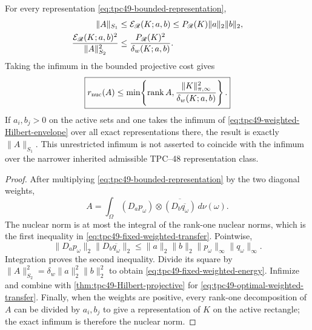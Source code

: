 \begin{theorem}
\label{thm:tpc49-weighted-transfer}
For every representation \eqref{eq:tpc49-bounded-representation},
\begin{align}
 \|A\|_{S_1}
 &\le \mathcal E_{\mathscr R}(K;a,b)
 \le P_{\mathscr R}(K)\|a\|_2\|b\|_2,
 \label{eq:tpc49-fixed-weighted-transfer}\\
 \frac{\mathcal E_{\mathscr R}(K;a,b)^2}{\|A\|_{S_2}^2}
 &\le\frac{P_{\mathscr R}(K)^2}{\delta_w(K;a,b)}.
 \label{eq:tpc49-fixed-weighted-energy}
\end{align}
Taking the infimum in the bounded projective cost gives
\begin{equation}
 \boxed{
 r_{\rm nuc}(A)
 \le\min\!\left\{\operatorname{rank}A,
 \frac{\|K\|_{\pi,\infty}^2}{\delta_w(K;a,b)}
 \right\}.}
 \label{eq:tpc49-optimal-weighted-transfer}
\end{equation}
If \(a_i,b_j>0\) on the active sets and one takes the infimum of
\eqref{eq:tpc49-weighted-Hilbert-envelope} over all exact
representations there, the result is exactly \(\|A\|_{S_1}\).
This unrestricted infimum is not asserted to coincide with the infimum
over the narrower inherited admissible TPC--48 representation class.
\end{theorem}

\begin{proof}
After multiplying \eqref{eq:tpc49-bounded-representation} by the two
diagonal weights,
\begin{equation}
 A=\int_\Omega
 (D_ap_\omega)\otimes
 \overline{(D_b\overline{q_\omega})}\,d\nu(\omega).
 \label{eq:tpc49-weighted-rank-one-integral}
\end{equation}
The nuclear norm is at most the integral of the rank-one nuclear norms,
which is the first inequality in
\eqref{eq:tpc49-fixed-weighted-transfer}.  Pointwise,
\begin{equation}
 \|D_ap_\omega\|_2
 \|D_b\overline{q_\omega}\|_2
 \le\|a\|_2\|b\|_2
 \|p_\omega\|_\infty\|q_\omega\|_\infty.
 \label{eq:tpc49-layer-sup-to-Hilbert}
\end{equation}
Integration proves the second inequality.  Divide its square by
 \(\|A\|_{S_2}^2=\delta_w\|a\|_2^2\|b\|_2^2\) to obtain
\eqref{eq:tpc49-fixed-weighted-energy}.  Infimize and combine with
\cref{thm:tpc49-Hilbert-projective} for
\eqref{eq:tpc49-optimal-weighted-transfer}.  Finally, when the weights
are positive, every rank-one decomposition of \(A\) can be divided by
\(a_i,b_j\) to give a representation of \(K\) on the active rectangle;
the exact infimum is therefore the nuclear norm.
\end{proof}


